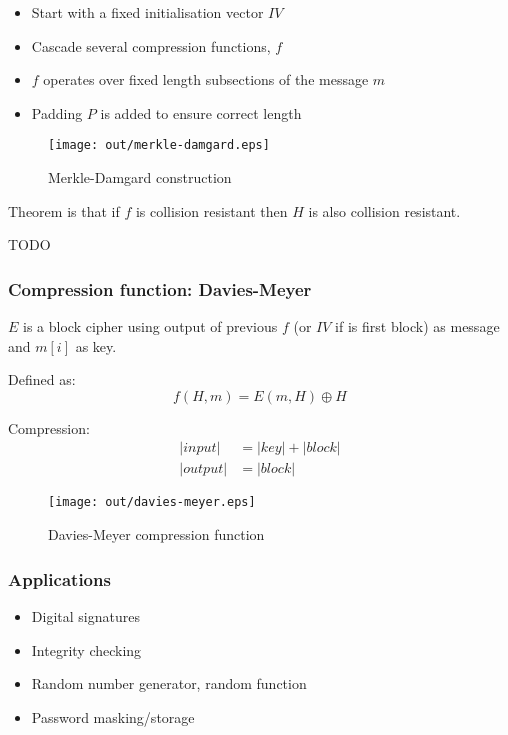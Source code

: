 \documentclass[a4paper]{article}
\begin{document}
\begin{itemize}
  \item Start with a fixed initialisation vector $IV$
  \item Cascade several compression functions, $f$
  \item $f$ operates over fixed length subsections of the message $m$
  \item Padding $P$ is added to ensure correct length
\end{itemize}

\begin{figure}[h!]
  \centering
  \texttt{[image: out/merkle-damgard.eps]}
  \caption{Merkle-Damgard construction}
  \label{fig:merkle-damgard}
\end{figure}
\FloatBarrier

Theorem is that if $f$ is collision resistant then $H$ is also collision
resistant.


TODO

\subsubsection{Compression function: Davies-Meyer}

$E$ is a block cipher using output of previous $f$ (or $IV$ if is first block)
as message and $m[i]$ as key.

Defined as:
\[
  f(H, m) = E(m, H) \oplus H
\]

Compression:
\begin{align*}
   |input| &= |key| + |block| \\
  |output| &= |block|
\end{align*}

\begin{figure}[h!]
  \centering
  \texttt{[image: out/davies-meyer.eps]}
  \caption{Davies-Meyer compression function}
  \label{fig:davies-meyer}
\end{figure}
\FloatBarrier

\subsubsection{Applications}

\begin{itemize}
  \item Digital signatures
  \item Integrity checking
  \item Random number generator, random function
  \item Password masking/storage
\end{itemize}
\end{document}
